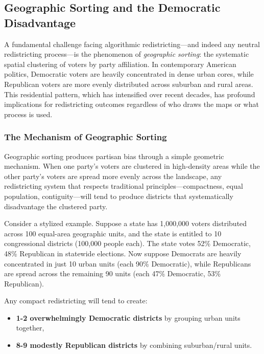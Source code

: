
\subsection{Geographic Sorting and the Democratic Disadvantage}
\label{sec:geographic-sorting-mechanism}

A fundamental challenge facing algorithmic redistricting---and indeed any neutral redistricting process---is the phenomenon of \textit{geographic sorting}: the systematic spatial clustering of voters by party affiliation. In contemporary American politics, Democratic voters are heavily concentrated in dense urban cores, while Republican voters are more evenly distributed across suburban and rural areas. This residential pattern, which has intensified over recent decades, has profound implications for redistricting outcomes regardless of who draws the maps or what process is used.

\subsubsection{The Mechanism of Geographic Sorting}
\label{sec:sorting_mechanism}

Geographic sorting produces partisan bias through a simple geometric mechanism. When one party's voters are clustered in high-density areas while the other party's voters are spread more evenly across the landscape, any redistricting system that respects traditional principles---compactness, equal population, contiguity---will tend to produce districts that systematically disadvantage the clustered party.

Consider a stylized example. Suppose a state has 1,000,000 voters distributed across 100 equal-area geographic units, and the state is entitled to 10 congressional districts (100,000 people each). The state votes 52\% Democratic, 48\% Republican in statewide elections. Now suppose Democrats are heavily concentrated in just 10 urban units (each 90\% Democratic), while Republicans are spread across the remaining 90 units (each 47\% Democratic, 53\% Republican).

Any compact redistricting will tend to create:
\begin{itemize}
\item \textbf{1-2 overwhelmingly Democratic districts} by grouping urban units together,
\item \textbf{8-9 modestly Republican districts} by combining suburban/rural units.
\end{itemize}

